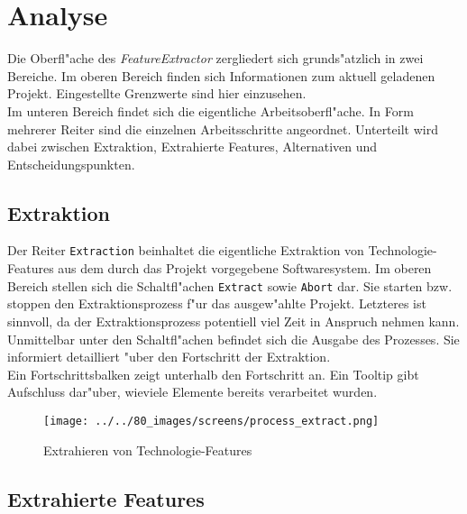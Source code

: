 \documentclass{proc}
\begin{document}
	\section{Analyse}
	
	Die Oberfl"ache des \textit{FeatureExtractor} zergliedert sich grunds"atzlich in zwei Bereiche.
	Im oberen Bereich finden sich Informationen zum aktuell geladenen Projekt.
	Eingestellte Grenzwerte sind hier einzusehen.
	\\
	Im unteren Bereich findet sich die eigentliche Arbeitsoberfl"ache.
	In Form mehrerer Reiter sind die einzelnen Arbeitsschritte angeordnet.
	Unterteilt wird dabei zwischen Extraktion, Extrahierte Features, Alternativen und Entscheidungspunkten.
	
	\subsection{Extraktion}
	
	Der Reiter \texttt{Extraction} beinhaltet die eigentliche Extraktion von Technologie-Features aus dem durch das Projekt vorgegebene Softwaresystem.
	Im oberen Bereich stellen sich die Schaltfl"achen \texttt{Extract} sowie \texttt{Abort} dar.
	Sie starten bzw. stoppen den Extraktionsprozess f"ur das ausgew"ahlte Projekt.
	Letzteres ist sinnvoll, da der Extraktionsprozess potentiell viel Zeit in Anspruch nehmen kann.
	\\
	Unmittelbar unter den Schaltfl"achen befindet sich die Ausgabe des Prozesses.
	Sie informiert detailliert "uber den Fortschritt der Extraktion.
	\\
	Ein Fortschrittsbalken zeigt unterhalb den Fortschritt an.
	Ein Tooltip gibt Aufschluss dar"uber, wieviele Elemente bereits verarbeitet wurden.
	
	\begin{figure}[h!]
		\centering
		\caption{Extrahieren von Technologie-Features}
		\texttt{[image: ../../80\_images/screens/process\_extract.png]}
	\end{figure}
	
	\subsection{Extrahierte Features}
	
\end{document}
